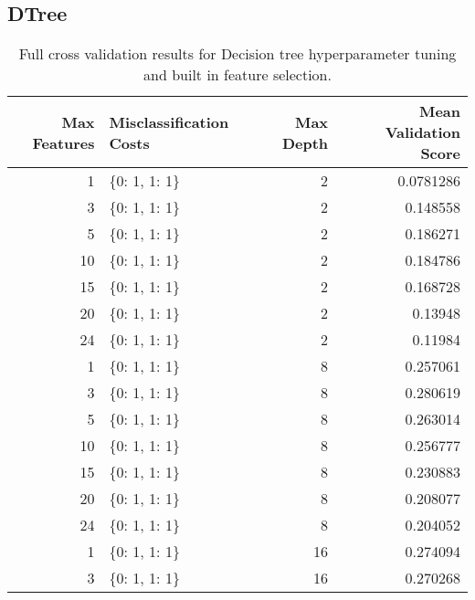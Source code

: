 \documentclass{article}
\begin{document}
\subsection{DTree}
\begin{table}[H]
\centering
\caption{Full cross validation results for Decision tree hyperparameter tuning and built in feature selection.}
\label{tab:dtree-builtin-full}
\begin{tabular}{rlrr}
\hline
   Max Features & Misclassification Costs   &   Max Depth &   Mean Validation Score \\
\hline
              1 & \{0: 1, 1: 1\}              &           2 &               0.0781286 \\
              3 & \{0: 1, 1: 1\}              &           2 &               0.148558  \\
              5 & \{0: 1, 1: 1\}              &           2 &               0.186271  \\
             10 & \{0: 1, 1: 1\}              &           2 &               0.184786  \\
             15 & \{0: 1, 1: 1\}              &           2 &               0.168728  \\
             20 & \{0: 1, 1: 1\}              &           2 &               0.13948   \\
             24 & \{0: 1, 1: 1\}              &           2 &               0.11984   \\
              1 & \{0: 1, 1: 1\}              &           8 &               0.257061  \\
              3 & \{0: 1, 1: 1\}              &           8 &               0.280619  \\
              5 & \{0: 1, 1: 1\}              &           8 &               0.263014  \\
             10 & \{0: 1, 1: 1\}              &           8 &               0.256777  \\
             15 & \{0: 1, 1: 1\}              &           8 &               0.230883  \\
             20 & \{0: 1, 1: 1\}              &           8 &               0.208077  \\
             24 & \{0: 1, 1: 1\}              &           8 &               0.204052  \\
              1 & \{0: 1, 1: 1\}              &          16 &               0.274094  \\
              3 & \{0: 1, 1: 1\}              &          16 &               0.270268  \\

\end{tabular}
\end{table}
\end{document}
